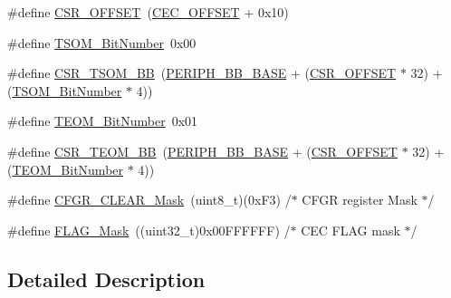 \begin{DoxyCompactItemize}
\item 
\#define \mbox{\hyperlink{group___c_e_c___private___defines_ga984cbe73312b6d3d355c5053763d499a}{C\+S\+R\+\_\+\+O\+F\+F\+S\+ET}}~(\mbox{\hyperlink{group___c_e_c___private___defines_ga675324bd8967b75f32554f50210821af}{C\+E\+C\+\_\+\+O\+F\+F\+S\+ET}} + 0x10)
\item 
\#define \mbox{\hyperlink{group___c_e_c___private___defines_ga1a470abab836eba7b451950938708946}{T\+S\+O\+M\+\_\+\+Bit\+Number}}~0x00
\item 
\#define \mbox{\hyperlink{group___c_e_c___private___defines_ga4971cc50b0ead4a493e2a9c03966c826}{C\+S\+R\+\_\+\+T\+S\+O\+M\+\_\+\+BB}}~(\mbox{\hyperlink{group___peripheral__memory__map_gaed7efc100877000845c236ccdc9e144a}{P\+E\+R\+I\+P\+H\+\_\+\+B\+B\+\_\+\+B\+A\+SE}} + (\mbox{\hyperlink{group___r_c_c___private___defines_ga984cbe73312b6d3d355c5053763d499a}{C\+S\+R\+\_\+\+O\+F\+F\+S\+ET}} $\ast$ 32) + (\mbox{\hyperlink{group___c_e_c___private___defines_ga1a470abab836eba7b451950938708946}{T\+S\+O\+M\+\_\+\+Bit\+Number}} $\ast$ 4))
\item 
\#define \mbox{\hyperlink{group___c_e_c___private___defines_gac86378eff7728e5cfca5480ab2dbef0b}{T\+E\+O\+M\+\_\+\+Bit\+Number}}~0x01
\item 
\#define \mbox{\hyperlink{group___c_e_c___private___defines_ga9ac493d98ce1f6d82b778ace0f2bc7bb}{C\+S\+R\+\_\+\+T\+E\+O\+M\+\_\+\+BB}}~(\mbox{\hyperlink{group___peripheral__memory__map_gaed7efc100877000845c236ccdc9e144a}{P\+E\+R\+I\+P\+H\+\_\+\+B\+B\+\_\+\+B\+A\+SE}} + (\mbox{\hyperlink{group___r_c_c___private___defines_ga984cbe73312b6d3d355c5053763d499a}{C\+S\+R\+\_\+\+O\+F\+F\+S\+ET}} $\ast$ 32) + (\mbox{\hyperlink{group___c_e_c___private___defines_gac86378eff7728e5cfca5480ab2dbef0b}{T\+E\+O\+M\+\_\+\+Bit\+Number}} $\ast$ 4))
\item 
\#define \mbox{\hyperlink{group___c_e_c___private___defines_gaaedf9b8df17534f5eaf75ec1ca3fbd7a}{C\+F\+G\+R\+\_\+\+C\+L\+E\+A\+R\+\_\+\+Mask}}~(uint8\+\_\+t)(0x\+F3)        /$\ast$ C\+F\+G\+R register Mask $\ast$/
\item 
\#define \mbox{\hyperlink{group___c_e_c___private___defines_ga2be62bf481cd44de9ab604efe5595ff6}{F\+L\+A\+G\+\_\+\+Mask}}~((uint32\+\_\+t)0x00\+F\+F\+F\+F\+F\+F) /$\ast$ C\+E\+C F\+L\+A\+G mask $\ast$/
\end{DoxyCompactItemize}


\subsection{Detailed Description}


